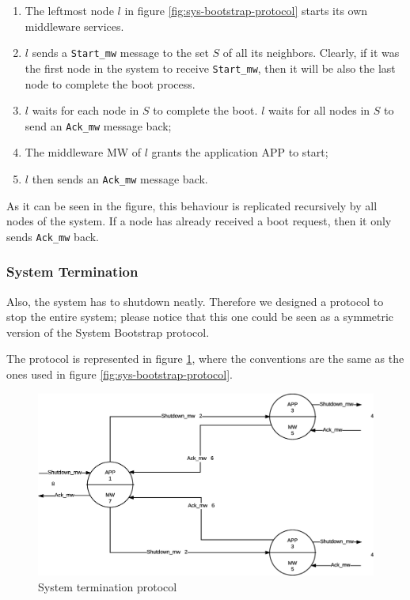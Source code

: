 \begin{enumerate}
\item The leftmost node $l$ in figure \ref{fig:sys-bootstrap-protocol}
  starts its own middleware services.
\item $l$ sends a \texttt{Start\_mw} message to the set $S$ of all its
  neighbors. Clearly, if it was the first node in the system to receive
  \texttt{Start\_mw}, then it will be also the last node to complete the
  boot process.
\item $l$ waits for each node in $S$ to complete the boot. $l$ waits for all
  nodes in $S$ to send an \texttt{Ack\_mw} message back;
\item The middleware MW of $l$ grants the application APP to start;
\item $l$ then sends an \texttt{Ack\_mw} message back.
\end{enumerate}

As it can be seen in the figure, this behaviour is replicated recursively
by all nodes of the system. If a node has already received a boot request,
then it only sends \texttt{Ack\_mw} back.

\subsubsection{System Termination}
Also, the system has to shutdown neatly. Therefore we designed a protocol to
stop the entire system; please notice that this one could be seen as a
symmetric version of the System Bootstrap protocol.

The protocol is represented in figure \ref{fig:sys-termination-protocol}, where
the conventions are the same as the ones used in figure
\ref{fig:sys-bootstrap-protocol}.

\begin{figure}[H]
  \centering
  \includegraphics[width=\columnwidth]{images/solution/termination.eps}
  \caption{System termination protocol}
  \label{fig:sys-termination-protocol}
\end{figure}

